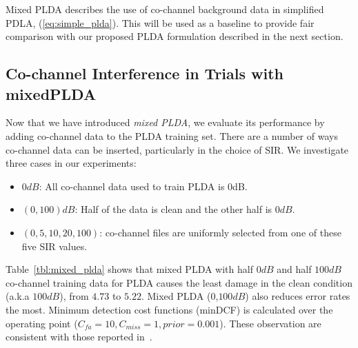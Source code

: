 Mixed PLDA describes the use of co-channel background data in simplified PDLA, (\ref{eq:simple_plda}). 
This will be used as a baseline to provide fair comparison with our proposed PLDA formulation described in the next section. 

\subsection{Co-channel Interference in Trials with mixedPLDA} 
\label{sssec:mixedplda_exp}

Now that we have introduced {\it mixed PLDA}, we evaluate its performance by adding co-channel data to the PLDA training set. 
There are a number of ways co-channel data can be inserted, particularly in the choice of SIR. 
We investigate three cases in our experiments: 
\begin{itemize}
	\item $0dB$: All co-channel data used to train PLDA is 0dB. 
	\item $(0,100)dB$: Half of the data is clean and the other half is $0dB$. 
	\item $(0,5,10,20,100)$: co-channel files are uniformly selected from one of these five SIR values. 
\end{itemize}

Table~\ref{tbl:mixed_plda} shows that mixed PLDA with half $0dB$ and half $100dB$ co-channel training data for PLDA causes the least damage in the clean condition (a.k.a $100dB$), from $4.73$ to $5.22$. Mixed PLDA ($0$,$100dB$) also reduces error rates the most. 
Minimum detection cost functions (minDCF) is calculated over the operating point ($C_{fa}=10, C_{miss}=1, prior = 0.001$). 
These observation are consistent with those reported in~\cite{shokouhi2015probabilistic}. 

